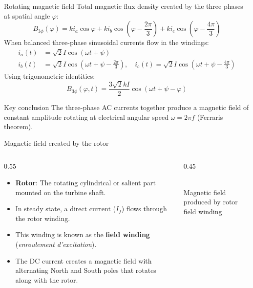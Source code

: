 \begin{frame}[allowframebreaks]{Rotating magnetic field}
  Total magnetic flux density created by the three phases at spatial angle $\varphi$:
  $$B_{3\phi}(\varphi) = k i_a \cos\varphi + k i_b \cos\left(\varphi - \frac{2\pi}{3}\right) + k i_c \cos\left(\varphi - \frac{4\pi}{3}\right)$$
  When balanced three-phase sinusoidal currents flow in the windings:
  \begin{align*}
    i_a(t) &= \sqrt{2} I \cos(\omega t + \psi) \\
    i_b(t) &= \sqrt{2} I \cos\left(\omega t + \psi - \frac{2\pi}{3}\right), \quad
    i_c(t) = \sqrt{2} I \cos\left(\omega t + \psi - \frac{4\pi}{3}\right)
  \end{align*}
  Using trigonometric identities:
  $$B_{3\phi}(\varphi, t) = \frac{3\sqrt{2} k I}{2} \cos(\omega t + \psi - \varphi)$$
  \begin{block}{Key conclusion}
    The three-phase AC currents together produce a magnetic field of constant amplitude rotating at electrical angular speed $\omega = 2\pi f$ (Ferraris theorem).
  \end{block}
\end{frame}

\begin{frame}{Magnetic field created by the rotor}
  \begin{columns}
    \begin{column}{0.55\textwidth}
      \begin{itemize}
        \item \textbf{Rotor}: The rotating cylindrical or salient part mounted on the turbine shaft.
        \item In steady state, a direct current ($I_f$) flows through the rotor winding.
        \item This winding is known as the \textbf{field winding} (\textit{enroulement d'excitation}).
        \item The DC current creates a magnetic field with alternating North and South poles that rotates along with the rotor.
      \end{itemize}
    \end{column}
    \begin{column}{0.45\textwidth}
      \begin{center}
        \resizebox{0.95\linewidth}{!}{}\\
        \vspace{0.1cm}
        \tiny Magnetic field produced by rotor field winding
      \end{center}
    \end{column}
  \end{columns}
\end{frame}

